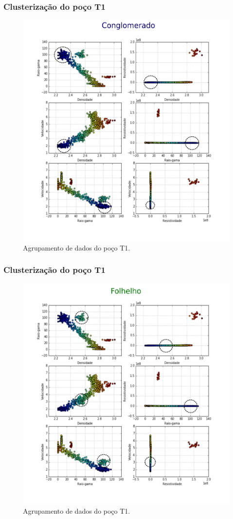 \documentclass[aspectratio=10]{beamer} %
\begin{document}
\begin{frame}
\frametitle{Clusterização do poço T1}
\begin{figure}[H]
\centering
\includegraphics[scale=0.4]{Imagens/conglomerado.png}
\caption{Agrupamento de dados do poço T1.}
\end{figure} 
\end{frame}
\begin{frame}
\frametitle{Clusterização do poço T1}
\begin{figure}[H]
\centering
\includegraphics[scale=0.4]{Imagens/folhelho.png}
\caption{Agrupamento de dados do poço T1.}
\end{figure} 
\end{frame}
\end{document}
